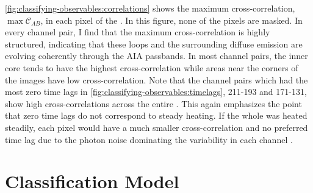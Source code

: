 \autoref{fig:classifying-observables:correlations} shows the maximum cross-correlation, $\max\mathcal{C}_{AB}$, in each pixel of the \AR{}. In this figure, none of the pixels are masked. In every channel pair, I find that the maximum cross-correlation is highly structured, indicating that these loops and the surrounding diffuse emission are evolving coherently through the AIA passbands. In most channel pairs, the inner core tends to have the highest cross-correlation while areas near the corners of the images have low cross-correlation. Note that the channel pairs which had the most zero time lags in \autoref{fig:classifying-observables:timelags}, 211-193 and 171-131, show high cross-correlations across the entire \AR{}. This again emphasizes the point that zero time lags do not correspond to steady heating. If the whole \AR{} was heated steadily, each pixel would have a much smaller cross-correlation and no preferred time lag due to the photon noise dominating the variability in each channel \citep{viall_signatures_2016}.

\section{Classification Model}\label{sec:classifying-observables:compare}

